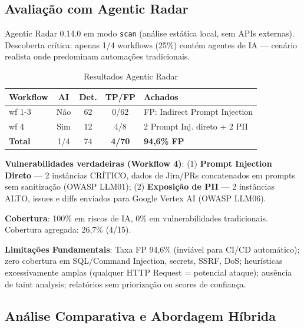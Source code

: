 \documentclass[12pt,a4paper]{article}
\begin{document}
\subsection{Avaliação com Agentic Radar}

Agentic Radar 0.14.0 em modo \texttt{scan} (análise estática local, sem APIs externas). Descoberta crítica: apenas 1/4 workflows (25\%) contém agentes de IA — cenário realista onde predominam automações tradicionais.

\begin{table}[H]
\centering
\caption{Resultados Agentic Radar}
\label{tab:agentic-radar-results}
\begin{tabular}{@{}lcccl@{}}
\toprule
\textbf{Workflow} & \textbf{AI} & \textbf{Det.} & \textbf{TP/FP} & \textbf{Achados} \\ \midrule
wf 1-3 & Não & 62 & 0/62 & FP: Indirect Prompt Injection \\
wf 4 & Sim & 12 & 4/8 & 2 Prompt Inj. direto + 2 PII \\
\textbf{Total} & 1/4 & 74 & \textbf{4/70} & \textbf{94,6\% FP} \\ \bottomrule
\end{tabular}
\end{table}

\textbf{Vulnerabilidades verdadeiras (Workflow 4)}: (1) \textbf{Prompt Injection Direto} — 2 instâncias CRÍTICO, dados de Jira/PRs concatenados em prompts sem sanitização (OWASP LLM01); (2) \textbf{Exposição de PII} — 2 instâncias ALTO, issues e diffs enviados para Google Vertex AI (OWASP LLM06).

\textbf{Cobertura}: 100\% em riscos de IA, 0\% em vulnerabilidades tradicionais. Cobertura agregada: 26,7\% (4/15).

\textbf{Limitações Fundamentais}: Taxa FP 94,6\% (inviável para CI/CD automático); zero cobertura em SQL/Command Injection, secrets, SSRF, DoS; heurísticas excessivamente amplas (qualquer HTTP Request = potencial ataque); ausência de taint analysis; relatórios sem priorização ou scores de confiança.

\subsection{Análise Comparativa e Abordagem Híbrida}
\end{document}
